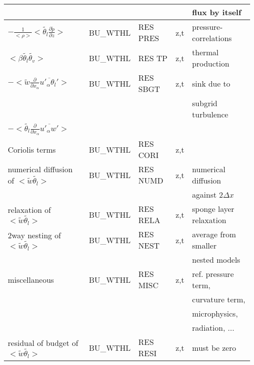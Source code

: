 \begin{center}
\begin{tabular}{||p{5cm}|>{\centering}p{2cm}|>{\centering}p{2.5cm}|>{\centering}p{0.5cm}|p{5.5cm }||}
 & & & & flux by itself \\
\hline
$- \frac{1}{<\rho>}<\tilde{\theta_l} \frac{\partial \tilde{p}}{\partial z}>$ & BU\_WTHL & RES PRES & z,t & pressure-correlations \\
\hline
$ <\beta  \tilde{\theta_l}\tilde{\theta_v}> $  & BU\_WTHL & RES TP   & z,t & thermal production \\
\hline
$- <\tilde{w}\frac{\partial}{\partial x_\alpha}\overline{u'_\alpha \theta_l'}>$
& BU\_WTHL & RES SBGT & z,t & sink due to\\
 & & & & subgrid turbulence \\
$- <\tilde{\theta_l}\frac{\partial}{\partial x_\alpha}\overline{u'_\alpha w'}>$
&&&&\\
\hline
{\rm Coriolis terms} & BU\_WTHL & RES CORI & z,t & \\
\hline
{\rm numerical diffusion of } $<\tilde{w}\tilde{\theta_l}>$& BU\_WTHL & RES NUMD & z,t & numerical diffusion\\
 & & & &against $2\Delta x$ \\
\hline
{\rm relaxation of }$<\tilde{w}\tilde{\theta_l}>$ & BU\_WTHL & RES RELA & z,t& sponge layer relaxation \\
\hline
{\rm 2way nesting of }$<\tilde{w}\tilde{\theta_l}>$ & BU\_WTHL & RES NEST & z,t& average from smaller \\
 & & & & nested models \\
\hline
{\rm miscellaneous} & BU\_WTHL & RES MISC & z,t & ref. pressure term,\\
 & & & & curvature term,\\
 & & & & microphysics,\\
 & & & & radiation, ...\\
\hline
{\rm residual of budget of} $<\tilde{w}\tilde{\theta_l}>$ & BU\_WTHL & RES RESI & z,t & must be zero \\
\hline
\hline
\end{tabular}
\end{center}

